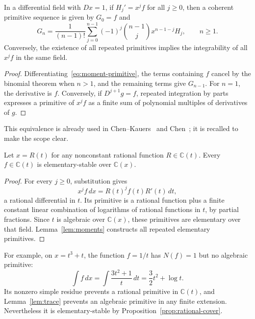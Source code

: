 \begin{lemma}
\label{lem:moments}
In a differential field with $Dx=1$, if $H_j'=x^jf$ for all $j\ge0$,
then a coherent primitive sequence is given by $G_0=f$ and
\begin{equation}\label{eq:moment-primitive}
 G_n=\frac1{(n-1)!}\sum_{j=0}^{n-1}
       (-1)^j\binom{n-1}{j}x^{n-1-j}H_j,\qquad n\ge1.
\end{equation}
Conversely, the existence of all repeated primitives implies the
integrability of all $x^jf$ in the same field.
\end{lemma}
\begin{proof}
Differentiating~\eqref{eq:moment-primitive}, the terms containing $f$
cancel by the binomial theorem when $n>1$, and the remaining terms give
$G_{n-1}$. For $n=1$, the derivative is $f$. Conversely, if
$D^{j+1}g=f$, repeated integration by parts expresses a primitive of
$x^jf$ as a finite sum of polynomial multiples of derivatives of $g$.
\end{proof}
This equivalence is already used in Chen--Kauers~\cite{CK2016} and
Chen~\cite[Lemma~2.10]{Chen2022}; it is recalled to make the scope clear.

\begin{proposition}
\label{prop:rational-cover}
Let $x=R(t)$ for any nonconstant rational function
$R\in\mathbb C(t)$. Every $f\in\mathbb C(t)$ is elementary-stable
over $\mathbb C(x)$.
\end{proposition}
\begin{proof}
For every $j\ge0$, substitution gives
\[
 x^jf\,dx=R(t)^j f(t)R'(t)\,dt,
\]
a rational differential in $t$. Its primitive is a rational function
plus a finite constant linear combination of logarithms of rational
functions in $t$, by partial fractions. Since $t$ is algebraic over
$\mathbb C(x)$, these primitives are elementary over that field.
Lemma~\ref{lem:moments} constructs all repeated elementary primitives.
\end{proof}

For example, on $x=t^3+t$, the function $f=1/t$ has
$N(f)=1$ but no algebraic primitive:
\[
 \int f\,dx=\int\frac{3t^2+1}{t}\,dt
          =\frac32t^2+\log t.
\]
Its nonzero simple residue prevents a rational primitive in $\mathbb C(t)$,
and Lemma~\ref{lem:trace} prevents an algebraic primitive in any finite
extension. Nevertheless it is elementary-stable by
Proposition~\ref{prop:rational-cover}.

